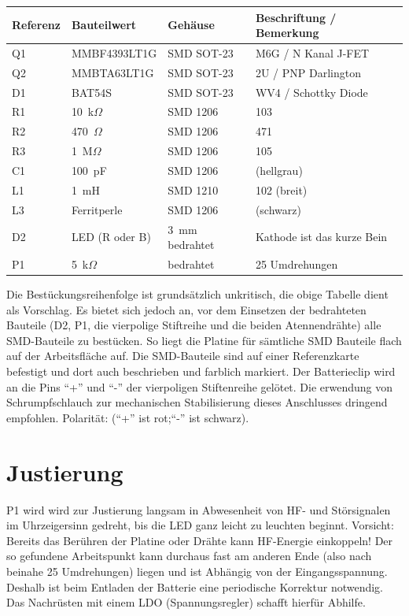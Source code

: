 \documentclass[a4paper,11pt,halfparskip,smallheadings,DIV=10]{scrartcl}
\begin{document}
\begin{center}\begin{tabular}{llll}\toprule
    \textbf{Referenz} & \textbf{Bauteilwert} & \textbf{Gehäuse} & \textbf{Beschriftung / Bemerkung}\\\midrule
Q1 & MMBF4393LT1G & SMD SOT-23 & M6G / N Kanal J-FET\\ %
Q2 & MMBTA63LT1G  & SMD SOT-23 & 2U / PNP Darlington\\ 
D1 & BAT54S       & SMD SOT-23 & WV4 / Schottky Diode\\ %
R1 & 10~k$\Omega$ & SMD 1206 & 103 \\
R2 & 470~$\Omega$ & SMD 1206 & 471 \\
R3 & 1~M$\Omega$  & SMD 1206 & 105 \\
C1 & 100~pF       & SMD 1206 & (hellgrau) \\
L1 & 1~mH         & SMD 1210   & 102 (breit) \\
L3 & Ferritperle  & SMD 1206   & (schwarz) \\\midrule
D2 & LED (R oder B)    & 3~mm bedrahtet & Kathode ist das kurze Bein\\
P1 & 5~k$\Omega$  & bedrahtet  & 25 Umdrehungen\\\bottomrule
\end{tabular}\end{center}

Die Bestückungsreihenfolge ist grundsätzlich unkritisch, die obige Tabelle
dient als Vorschlag. Es bietet sich jedoch an, vor dem Einsetzen der bedrahteten
Bauteile (D2, P1, die vierpolige Stiftreihe und die beiden Atennendrähte)
alle SMD-Bauteile zu bestücken. So liegt die Platine für sämtliche SMD Bauteile
flach auf der Arbeitsfläche auf. Die SMD-Bauteile sind auf einer Referenzkarte
befestigt und dort auch beschrieben und farblich markiert. Der Batterieclip
wird an die Pins ``+'' und ``-'' der vierpoligen Stiftenreihe gelötet. Die
erwendung von Schrumpfschlauch zur mechanischen Stabilisierung dieses
Anschlusses dringend empfohlen. Polarität: (``+'' ist rot;``-'' ist schwarz).

\section{Justierung}
P1 wird wird zur Justierung langsam in Abwesenheit von HF- und Störsignalen im
Uhrzeigersinn gedreht, bis die LED ganz leicht zu leuchten beginnt. Vorsicht:
Bereits das Berühren der Platine oder Drähte kann HF-Energie einkoppeln!
Der so gefundene Arbeitspunkt kann durchaus fast am anderen Ende (also nach
beinahe 25 Umdrehungen) liegen und ist Abhängig von der Eingangsspannung. Deshalb
ist beim Entladen der Batterie eine periodische Korrektur notwendig. Das
Nachrüsten mit einem LDO (Spannungsregler) schafft hierfür Abhilfe.
\end{document}
